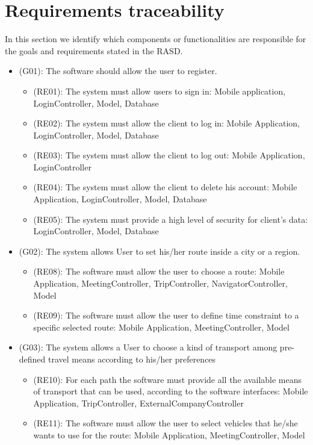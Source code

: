 \documentclass[a4paper,leqno]{article}
\begin{document}
\newpage
\section{Requirements traceability}
In this section we identify which components or functionalities are responsible for the goals and requirements stated in the RASD.

\begin{itemize}
	
	\item (G01): The software should allow the user to register.
	\begin{itemize}
		\item (RE01): The system must allow users to sign in: Mobile application, LoginController, Model, Database
		\item (RE02): The system must allow the client to log in: Mobile Application, LoginController, Model, Database
		\item (RE03): The system must allow the client to log out: Mobile Application, LoginController
		\item (RE04): The system must allow the client to delete his account: Mobile Application, LoginController, Model, Database
		\item (RE05): The system must provide a high level of security for client's data: LoginController, Model, Database
	\end{itemize}
	\item (G02): The system allows User to set his/her route inside a city or a region.
	\begin{itemize}
		\item (RE08): The software must allow the user to choose a route: Mobile Application, MeetingController, TripController, NavigatorController, Model
		\item (RE09): The software must allow the user to define time constraint to a specific selected route: Mobile Application, MeetingController, Model
	\end{itemize}
	\item (G03): The system allows a User to choose a kind of transport among pre-defined travel means according to his/her preferences
	\begin{itemize}
		\item (RE10): For each path the software must provide all the available means of transport that can be used, according to the software interfaces: Mobile Application, TripController, ExternalCompanyController
		\item (RE11): The software must allow the user to select vehicles that he/she wants to use for the route: Mobile Application, MeetingController, Model

\end{itemize}
\end{itemize}
\end{document}

